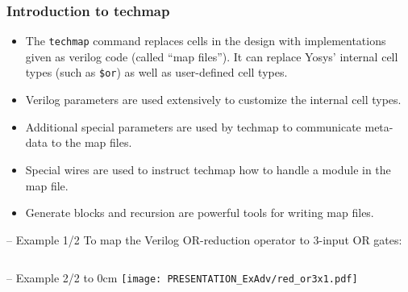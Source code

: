 \begin{frame}
\subsectionpage
\subsectionpagesuffix
\end{frame}

\subsubsection{Introduction to techmap}

\begin{frame}{\subsubsecname}
\begin{itemize}
\item
The {\tt techmap} command replaces cells in the design with implementations given
as verilog code (called ``map files''). It can replace Yosys' internal cell
types (such as {\tt \$or}) as well as user-defined cell types.
\medskip\item
Verilog parameters are used extensively to customize the internal cell types.
\medskip\item
Additional special parameters are used by techmap to communicate meta-data to the
map files.
\medskip\item
Special wires are used to instruct techmap how to handle a module in the map file.
\medskip\item
Generate blocks and recursion are powerful tools for writing map files.
\end{itemize}
\end{frame}

\begin{frame}[t]{\subsubsecname{} -- Example 1/2}
\vskip-0.2cm
To map the Verilog OR-reduction operator to 3-input OR gates:
\vskip-0.2cm
\begin{columns}


\end{columns}
\end{frame}

\begin{frame}[t]{\subsubsecname{} -- Example 2/2}
\vbox to 0cm{
\hfil\texttt{[image: PRESENTATION\_ExAdv/red\_or3x1.pdf]}
\vss
}
\begin{columns}
\column[t]{6cm}
\column[t]{4cm}
\vskip-0.6cm
\vskip-0.2cm
\end{columns}
\end{frame}

